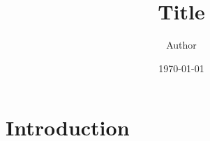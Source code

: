 \documentclass[11pt,a4paper]{article}
\title{Title}
\author{Author}
\date{\today}
\begin{document}
\maketitle

\section{Introduction}
\end{document}
